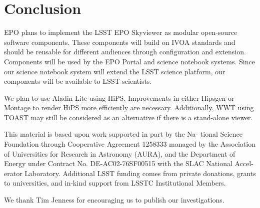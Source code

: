 \documentclass[11pt,twoside]{article}
\begin{document}
\section{Conclusion}
EPO plans to implement the LSST EPO Skyviewer as modular open-source software components. These components will build on IVOA standards and should be reusable for different audiences through configuration and extension. Components will be used by the EPO Portal and science notebook systems. Since our science notebook system will extend the LSST science platform, our components will be available to LSST scientists.

We plan to use Aladin Lite using HiPS. Improvements in either Hipsgen or Montage to render HiPS more efficiently are necessary. Additionally, WWT using TOAST may still be considered as an alternative if there is a stand-alone viewer.

\acknowledgements This material is based upon work supported in part by the Na- tional Science Foundation through Cooperative Agreement 1258333 managed by the Association of Universities for Research in Astronomy (AURA), and the Department of Energy under Contract No. DE-AC02-76SF00515 with the SLAC National Accel- erator Laboratory. Additional LSST funding comes from private donations, grants to universities, and in-kind support from LSSTC Institutional Members.

We thank Tim Jenness for encouraging us to publish our investigations.

\end{document}
